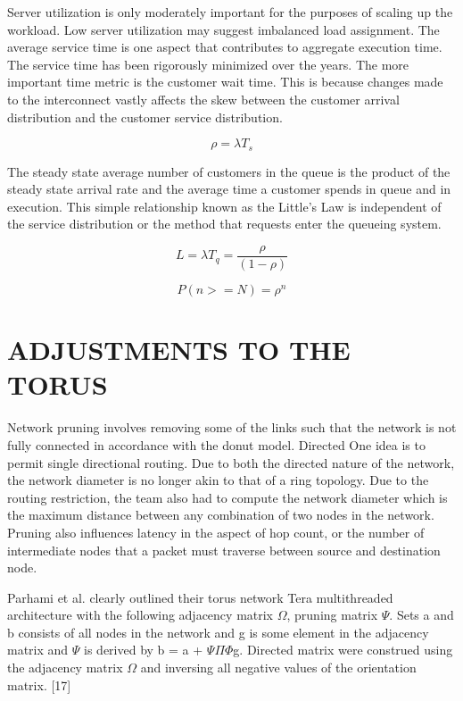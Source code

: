 \documentclass[letterpaper, 10 pt, conference]{ieeeconf}
\begin{document}
Server utilization is only moderately important for the purposes of scaling up the workload.  Low server utilization may suggest imbalanced load assignment.  The average service time is one aspect that contributes to aggregate execution time.  The service time has been rigorously minimized over the years.  The more important time metric is the customer wait time.  This is because changes made to the interconnect vastly affects the skew between the customer arrival distribution and the customer service distribution.

\begin{equation}
\rho = \lambda T_s
\end{equation}

The steady state average number of customers in the queue is the product of the steady state arrival rate and the average time a customer spends in queue and in execution.  This simple relationship known as the Little's Law is independent of the service distribution or the method that requests enter the queueing system.

\begin{equation}
L = \lambda T_q = \frac{\rho}{(1-\rho)}
\end{equation}

\begin{equation}
P(n>=N) = \rho ^{n}
\end{equation}

\section {ADJUSTMENTS TO THE TORUS} 
Network pruning involves removing some of the links such that the network is not fully connected in accordance with the donut model.  Directed One idea is to permit single directional routing.  Due to both the directed nature of the network, the network diameter is no longer akin to that of a ring topology.  Due to the routing restriction, the team also had to compute the network diameter which is the maximum distance between any combination of two nodes in the network.  Pruning also influences latency in the aspect of hop count, or the number of intermediate nodes that a packet must traverse between source and destination node.
 
Parhami et al. clearly outlined their torus network Tera multithreaded architecture with the following adjacency matrix $\Omega$, pruning matrix $\Psi$.  Sets a and b consists of all nodes in the network and g is some element in the adjacency matrix and  $\Psi$ is derived by b = a +  $\Psi$$\Pi$$\Phi$g.  Directed matrix were construed using the adjacency matrix $\Omega$ and inversing all negative values of the orientation matrix. [17]
\end{document}

